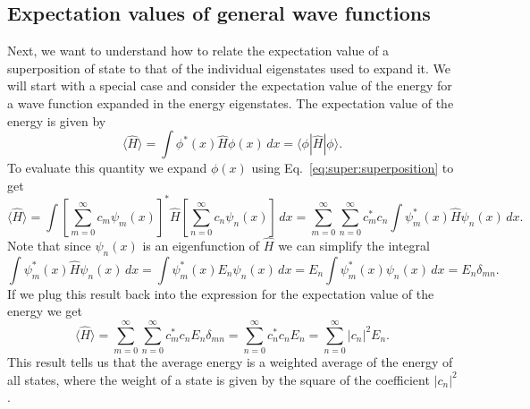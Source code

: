 \documentclass[../Main/chem331-notes.tex]{subfiles}
\begin{document}
\subsection{Expectation values of general wave functions}
Next, we want to understand how to relate the expectation value of a superposition of state to that of the individual eigenstates used to expand it.
We will start with a special case and consider the expectation value of the energy for a wave function expanded in the energy eigenstates.
The expectation value of the energy is given by
\begin{equation}
\langle \hat{H} \rangle = \int \phi^*(x) \hat{H} \phi(x) \, dx = \langle{\phi}|\hat{H}|{\phi}\rangle.
\end{equation}
To evaluate this quantity we expand $\phi(x)$ using Eq.~\eqref{eq:super:superposition} to get
\begin{equation}
\langle \hat{H} \rangle = \int \left[ \sum_{m = 0}^\infty c_m \psi_m(x) \right]^*  \hat{H} \left[ \sum_{n = 0}^\infty c_n \psi_n(x) \right] \, dx
 = \sum_{m = 0}^\infty \sum_{n = 0}^\infty   c^*_m c_n \int \psi^*_m(x) \hat{H} \psi_n(x) \, dx.
\end{equation}
Note that since $\psi_n(x)$ is an eigenfunction of $\hat{H}$ we can simplify the integral
\begin{equation}
\int \psi^*_m(x) \hat{H} \psi_n(x) \, dx =   \int \psi^*_m(x) E_n \psi_n(x) \, dx
=  E_n \int \psi^*_m(x) \psi_n(x) \, dx = E_n \delta_{mn}.
\end{equation}
If we plug this result back into the expression for the expectation value of the energy we get
\begin{equation}
\langle \hat{H} \rangle = \sum_{m = 0}^\infty \sum_{n = 0}^\infty   c^*_m c_n E_n \delta_{mn} = \sum_{n = 0}^\infty   c^*_n c_n E_n = \sum_{n = 0}^\infty   |c_n|^2 E_n.
\end{equation}
This result tells us that the average energy is a weighted average of the energy of all states, where the weight of a state is given by the square of the coefficient $|c_n|^2$.
\end{document}
